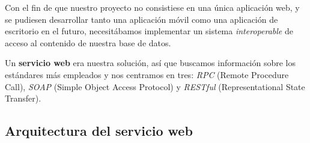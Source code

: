 Con el fin de que nuestro proyecto no consistiese en una única aplicación web, y se pudiesen desarrollar tanto una aplicación móvil como una aplicación de escritorio en el futuro, necesitábamos implementar un sistema \textit{interoperable} de acceso al contenido de nuestra base de datos.

\vspace{1em}

Un \textbf{servicio web} era nuestra solución, así que buscamos información sobre los estándares más empleados y nos centramos en tres: \textit{RPC} (Remote Procedure Call), \textit{SOAP} (Simple Object Access Protocol) y \textit{RESTful} (Representational State Transfer).
\subsection{Arquitectura del servicio web}

